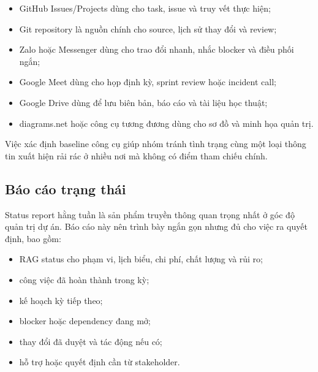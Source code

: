 \begin{itemize}
  \item GitHub Issues/Projects dùng cho task, issue và truy vết thực hiện;
  \item Git repository là nguồn chính cho source, lịch sử thay đổi và review;
  \item Zalo hoặc Messenger dùng cho trao đổi nhanh, nhắc blocker và điều phối ngắn;
  \item Google Meet dùng cho họp định kỳ, sprint review hoặc incident call;
  \item Google Drive dùng để lưu biên bản, báo cáo và tài liệu học thuật;
  \item diagrams.net hoặc công cụ tương đương dùng cho sơ đồ và minh họa quản trị.
\end{itemize}

Việc xác định baseline công cụ giúp nhóm tránh tình trạng cùng một loại thông tin xuất hiện rải rác ở nhiều nơi mà không có điểm tham chiếu chính.

\subsection{Báo cáo trạng thái}

Status report hằng tuần là sản phẩm truyền thông quan trọng nhất ở góc độ quản trị dự án. Báo cáo này nên trình bày ngắn gọn nhưng đủ cho việc ra quyết định, bao gồm:

\begin{itemize}
  \item RAG status cho phạm vi, lịch biểu, chi phí, chất lượng và rủi ro;
  \item công việc đã hoàn thành trong kỳ;
  \item kế hoạch kỳ tiếp theo;
  \item blocker hoặc dependency đang mở;
  \item thay đổi đã duyệt và tác động nếu có;
  \item hỗ trợ hoặc quyết định cần từ stakeholder.
\end{itemize}


